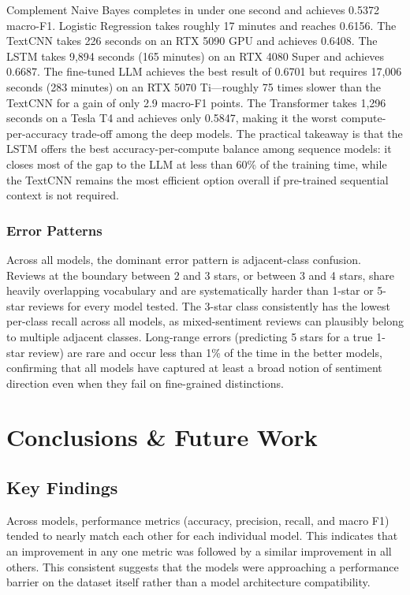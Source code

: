 \documentclass[12pt]{article}
\begin{document}
Complement Naive Bayes completes in under one second and achieves 0.5372 macro-F1. Logistic Regression takes roughly 17 minutes and reaches 0.6156. The TextCNN takes 226 seconds on an RTX 5090 GPU and achieves 0.6408. The LSTM takes 9,894 seconds (165 minutes) on an RTX 4080 Super and achieves 0.6687. The fine-tuned LLM achieves the best result of 0.6701 but requires 17,006 seconds (283 minutes) on an RTX 5070 Ti---roughly 75 times slower than the TextCNN for a gain of only 2.9 macro-F1 points. The Transformer takes 1,296 seconds on a Tesla T4 and achieves only 0.5847, making it the worst compute-per-accuracy trade-off among the deep models. The practical takeaway is that the LSTM offers the best accuracy-per-compute balance among sequence models: it closes most of the gap to the LLM at less than 60\% of the training time, while the TextCNN remains the most efficient option overall if pre-trained sequential context is not required.
 
\subsubsection{Error Patterns}
 
Across all models, the dominant error pattern is adjacent-class confusion. Reviews at the boundary between 2 and 3 stars, or between 3 and 4 stars, share heavily overlapping vocabulary and are systematically harder than 1-star or 5-star reviews for every model tested. The 3-star class consistently has the lowest per-class recall across all models, as mixed-sentiment reviews can plausibly belong to multiple adjacent classes. Long-range errors (predicting 5 stars for a true 1-star review) are rare and occur less than 1\% of the time in the better models, confirming that all models have captured at least a broad notion of sentiment direction even when they fail on fine-grained distinctions.
 
\newpage

\section{Conclusions \& Future Work}

\subsection{Key Findings}
Across models, performance metrics (accuracy, precision, recall, and macro F1) tended to nearly match each other for each individual model. This indicates that an improvement in any one metric was followed by a similar improvement in all others. This consistent suggests that the models were approaching a performance barrier on the dataset itself rather than a model architecture compatibility.
\end{document}
